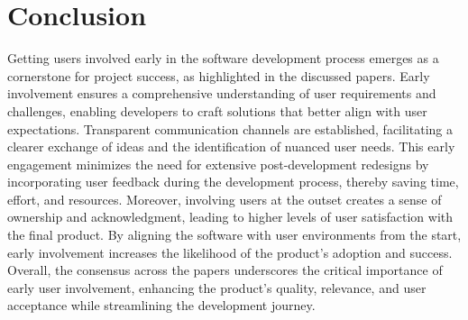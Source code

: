 \documentclass{article}
\begin{document}
\section{Conclusion}
Getting users involved early in the software development process emerges as a cornerstone for project success, as highlighted in the discussed papers. Early involvement ensures a comprehensive understanding of user requirements and challenges, enabling developers to craft solutions that better align with user expectations. Transparent communication channels are established, facilitating a clearer exchange of ideas and the identification of nuanced user needs. This early engagement minimizes the need for extensive post-development redesigns by incorporating user feedback during the development process, thereby saving time, effort, and resources. Moreover, involving users at the outset creates a sense of ownership and acknowledgment, leading to higher levels of user satisfaction with the final product. By aligning the software with user environments from the start, early involvement increases the likelihood of the product's adoption and success. Overall, the consensus across the papers underscores the critical importance of early user involvement, enhancing the product's quality, relevance, and user acceptance while streamlining the development journey.
\end{document}
